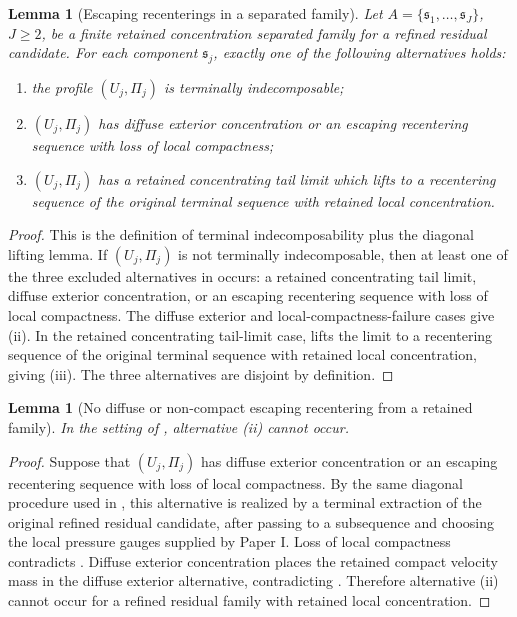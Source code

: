 \documentclass[11pt]{amsart}
\numberwithin{equation}{section}
\theoremstyle{plain}
\newtheorem{lemma}[theorem]{Lemma}
\theoremstyle{definition}
\theoremstyle{remark}
\begin{document}
\begin{lemma}[Escaping recenterings in a separated family]
\label{lem:finite-successor-alternatives}
Let \(A=\{\mathfrak s_1,\dots,\mathfrak s_J\}\), \(J\ge2\), be a finite
retained concentration separated family for a refined residual candidate.  For each component
\(\mathfrak s_j\), exactly one of the following alternatives holds:
\begin{enumerate}[label=(\roman*)]
   \item the profile \((U_j,\Pi_j)\) is terminally indecomposable;
   \item \((U_j,\Pi_j)\) has diffuse exterior concentration or an escaping
   recentering sequence with loss of local compactness;
   \item \((U_j,\Pi_j)\) has a retained concentrating tail limit which lifts to a
   recentering sequence of the original terminal sequence with retained local
   concentration.
\end{enumerate}
\end{lemma}

\begin{proof}
This is the definition of terminal indecomposability plus the diagonal lifting
lemma.  If \((U_j,\Pi_j)\) is not terminally indecomposable, then at least one
of the three excluded alternatives in  occurs:
a retained concentrating tail limit, diffuse exterior concentration, or an
escaping recentering sequence with loss of local compactness.  The diffuse
exterior and local-compactness-failure cases give (ii).  In the retained
concentrating tail-limit case,  lifts the
limit to a recentering sequence of the original terminal sequence with retained
local concentration, giving (iii).  The three alternatives are disjoint by
definition.
\end{proof}

\begin{lemma}[No diffuse or non-compact escaping recentering from a retained family]
\label{lem:no-nonactive-successor}
In the setting of , alternative
\emph{(ii)} cannot occur.
\end{lemma}

\begin{proof}
Suppose that \((U_j,\Pi_j)\) has diffuse exterior concentration or an escaping
recentering sequence with loss of local compactness.  By the
same diagonal procedure used in
, this alternative is realized by a
terminal extraction of the original refined residual candidate, after passing to
a subsequence and choosing the local pressure gauges supplied by Paper I.  Loss
of local compactness contradicts .  Diffuse
exterior concentration places the retained compact velocity mass in the diffuse
exterior alternative, contradicting .
Therefore alternative (ii) cannot occur for a refined residual family with
retained local concentration.
\end{proof}
\end{document}
